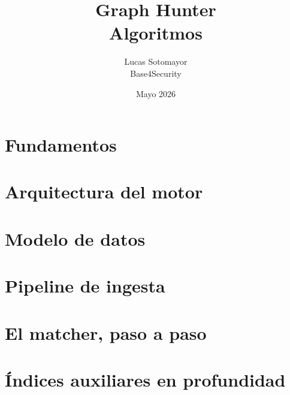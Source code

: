 \documentclass[11pt,openany]{book}
\title{\Huge\bfseries Graph Hunter\\[0.4em]\color{accent}\Large Algoritmos}
\author{Lucas Sotomayor\\Base4Security}
\date{Mayo 2026}
\begin{document}
\frontmatter
\maketitle




\tableofcontents

\mainmatter

\part{Fundamentos}






\part{Arquitectura del motor}



\part{Modelo de datos}





\part{Pipeline de ingesta}





\part{El matcher, paso a paso}











\part{Índices auxiliares en profundidad}



\end{document}
